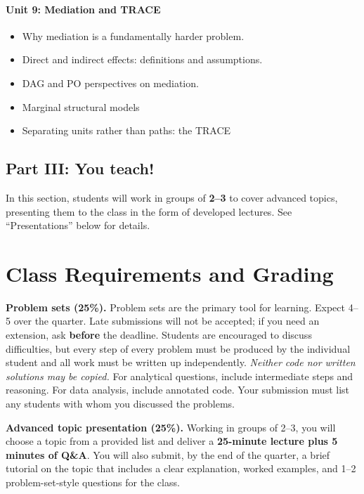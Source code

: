 \documentclass[PS]{syllabus}
\begin{document}
\begin{syllabus}
\paragraph{Unit 9: Mediation and TRACE}
\begin{itemize}
\item Why mediation is a fundamentally harder problem.
\item Direct and indirect effects: definitions and assumptions.
\item DAG and PO perspectives on mediation.
\item Marginal structural models
\item Separating units rather than paths: the TRACE
\end{itemize}

\subsection*{Part III: You teach!}

In this section, students will work in groups of \textbf{2--3} to cover advanced topics, presenting them to the class in the form of developed lectures. See ``Presentations'' below for details.


\section{Class Requirements and Grading}

\textbf{Problem sets (25\%).} Problem sets are the primary tool for learning. Expect 4--5 over the quarter. Late submissions will not be accepted; if you need an extension, ask \textbf{before} the deadline. Students are encouraged to discuss difficulties, but every step of every problem must be produced by the individual student and all work must be written up independently. \textit{Neither code nor written solutions may be copied.} For analytical questions, include intermediate steps and reasoning. For data analysis, include annotated code. Your submission must list any students with whom you discussed the problems.

\textbf{Advanced topic presentation (25\%).} Working in groups of 2--3, you will choose a topic from a provided list and deliver a \textbf{25-minute lecture plus 5 minutes of Q\&A}. You will also submit, by the end of the quarter, a brief tutorial on the topic that includes a clear explanation, worked examples, and 1--2 problem-set-style questions for the class.


\end{syllabus}
\end{document}
